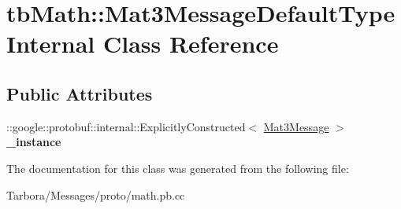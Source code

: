 \hypertarget{classtbMath_1_1Mat3MessageDefaultTypeInternal}{}\section{tb\+Math\+:\+:Mat3\+Message\+Default\+Type\+Internal Class Reference}
\label{classtbMath_1_1Mat3MessageDefaultTypeInternal}
\subsection*{Public Attributes}
\begin{DoxyCompactItemize}
\item 
\mbox{\label{classtbMath_1_1Mat3MessageDefaultTypeInternal_afc3d747ddc29dcf688e8f1b7b552b539}} 
\+::google\+::protobuf\+::internal\+::\+Explicitly\+Constructed$<$ \hyperlink{classtbMath_1_1Mat3Message}{Mat3\+Message} $>$ {\bfseries \+\_\+instance}
\end{DoxyCompactItemize}


The documentation for this class was generated from the following file\+:\begin{DoxyCompactItemize}
\item 
Tarbora/\+Messages/proto/math.\+pb.\+cc\end{DoxyCompactItemize}
